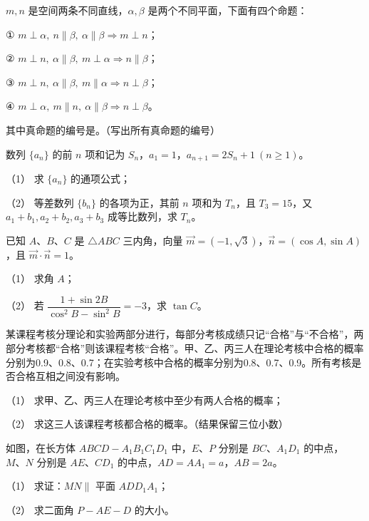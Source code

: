\begin{question}
$m,n$ 是空间两条不同直线，$\alpha,\beta$ 是两个不同平面，下面有四个命题：

① $m\perp\alpha,\ n\parallel\beta,\ \alpha\parallel\beta\Rightarrow m\perp n$；

② $m\perp n,\ \alpha\parallel\beta,\ m\perp\alpha\Rightarrow n\parallel\beta$；

③ $m\perp n,\ \alpha\parallel\beta,\ m\parallel\alpha\Rightarrow n\perp\beta$；

④ $m\perp\alpha,\ m\parallel n,\ \alpha\parallel\beta\Rightarrow n\perp\beta$。

其中真命题的编号是\gkblank{}。（写出所有真命题的编号）

\end{question}
\begin{question}
数列 $\{a_n\}$ 的前 $n$ 项和记为 $S_n$，$a_1=1$，$a_{n+1}=2S_n+1\ (n\geqslant1)$。

（1） 求 $\{a_n\}$ 的通项公式；

（2） 等差数列 $\{b_n\}$ 的各项为正，其前 $n$ 项和为 $T_n$，且 $T_3=15$，又 $a_1+b_1,a_2+b_2,a_3+b_3$ 成等比数列，求 $T_n$。

\end{question}
\begin{question}
已知 $A\text{、}B\text{、}C$ 是 $\triangle ABC$ 三内角，向量 $\vec m=(-1,\sqrt3)$，$\vec n=(\cos A,\sin A)$，且 $\vec m\cdot\vec n=1$。

（1） 求角 $A$；

（2） 若 $\dfrac{1+\sin2B}{\cos^2B-\sin^2B}=-3$，求 $\tan C$。

\end{question}
\begin{question}
某课程考核分理论和实验两部分进行，每部分考核成绩只记“合格”与“不合格”，两部分考核都“合格”则该课程考核“合格”。甲、乙、丙三人在理论考核中合格的概率分别为0.9、0.8、0.7；在实验考核中合格的概率分别为0.8、0.7、0.9。所有考核是否合格互相之间没有影响。

（1） 求甲、乙、丙三人在理论考核中至少有两人合格的概率；

（2） 求这三人该课程考核都合格的概率。（结果保留三位小数）

\Needspace{0.4\textheight}
\end{question}
\begin{question}
如图，在长方体 $ABCD-A_1B_1C_1D_1$ 中，$E\text{、}P$ 分别是 $BC\text{、}A_1D_1$ 的中点，$M\text{、}N$ 分别是 $AE\text{、}CD_1$ 的中点，$AD=AA_1=a$，$AB=2a$。

（1） 求证：$MN\parallel$ 平面 $ADD_1A_1$；

（2） 求二面角 $P-AE-D$ 的大小。
\nopagebreak[4]
\begin{center}\end{center}
\nopagebreak[4]
\end{question}
